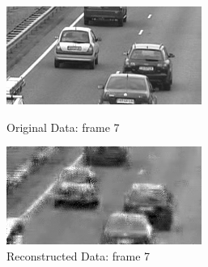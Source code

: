 \documentclass[12pt]{article}
\begin{document}
\begin{itemize}
\begin{enumerate}
    \begin{figure}[H]
        \centering
        \begin{minipage}{.45\textwidth}
            \centering
            \includegraphics[width=\linewidth]{results/cars_7_orig_7.png}
            \caption*{Original Data: frame 7}
        \end{minipage}
        \begin{minipage}{.45\textwidth}
            \centering
            \includegraphics[width=\linewidth]{results/cars_7_recon_7.png}
            \caption*{Reconstructed Data: frame 7}
        \end{minipage}
    \end{figure}


\end{enumerate}
\end{itemize}
\end{document}
